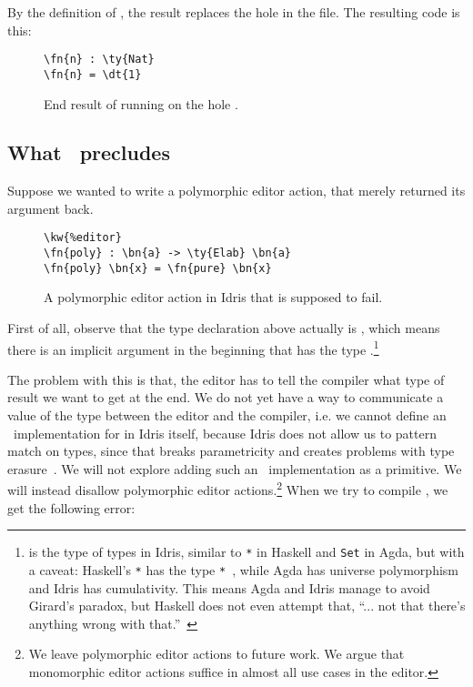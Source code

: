 By the definition of , the result  replaces the hole
 in the file. The resulting code is this:

\begin{figure}[H]
\caption{End result of running  on the hole .}
\begin{Verbatim}[framesep=2mm, label=\footnotesize{\normalfont{Idris}}, labelposition=topline]
\fn{n} : \ty{Nat}
\fn{n} = \dt{1}
\end{Verbatim}
\end{figure}


\subsection{What \Editorable\ precludes}\label{ssec:preclude}

Suppose we wanted to write a polymorphic editor action, that merely returned its argument back.

\begin{figure}[H]
  \caption{A polymorphic editor action  in Idris that is supposed to fail.}
\begin{Verbatim}[framesep=2mm, label=\footnotesize{\normalfont{Idris}}, labelposition=topline]
\kw{%editor}
\fn{poly} : \bn{a} -> \ty{Elab} \bn{a}
\fn{poly} \bn{x} = \fn{pure} \bn{x}
\end{Verbatim}
\end{figure}

First of all, observe that the type declaration above actually is
, which means
there is an implicit argument in the beginning that has the type
.\footnote{ is the type of types in Idris, similar to
\texttt{*} in Haskell and \texttt{Set} in Agda, but with a caveat:
Haskell's \texttt{*} has the type \texttt{*}~\cite{eisenberg}, while Agda has universe
polymorphism and Idris has cumulativity. This means Agda and Idris manage to
avoid Girard's paradox, but Haskell does not even attempt that, ``... not that
there's anything wrong with that.''~\cite{outing}}

The problem with this is that, the editor has to tell the compiler what type of
result we want to get at the end. We do not yet have a way to communicate a
value of the type  between the editor and the compiler, i.e. we cannot
define an \Editorable\ implementation for  in Idris itself, because
Idris does not allow us to pattern match on types, since that breaks
parametricity and creates problems with type erasure~\cite{universePat}.
We will not explore adding such an \Editorable\ implementation as a primitive.
We will instead disallow polymorphic editor actions.\footnote{We leave
polymorphic editor actions to future work. We argue that monomorphic editor
actions suffice in almost all use cases in the editor.}
When we try to compile , we get the following error:

